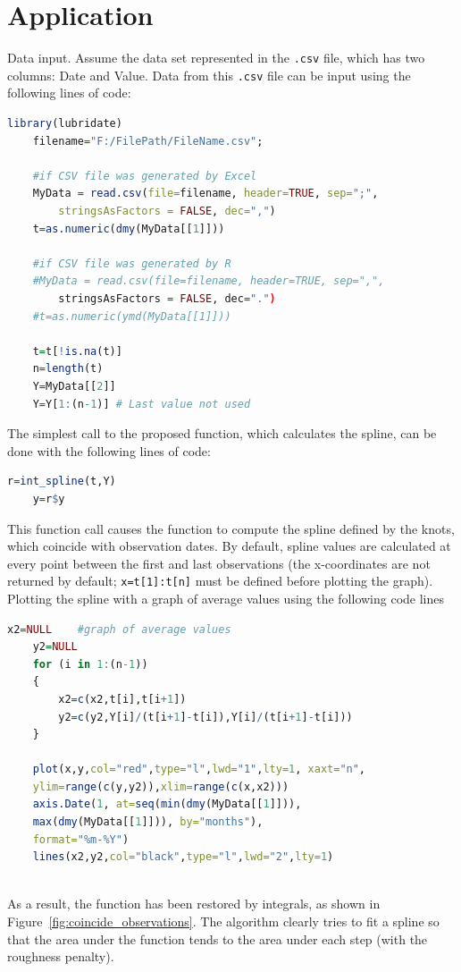 \documentclass[a4paper,10pt]{article}
\begin{document}
\section{Application} \label{sec:application}
Data input. Assume the data set represented in the \lstinline|.csv| file, which has two columns: Date and Value. Data from this \lstinline|.csv| file can be input using the following lines of code:
%
\begin{lstlisting}[language=R]
	library(lubridate)
	filename="F:/FilePath/FileName.csv";
	
	#if CSV file was generated by Excel
	MyData = read.csv(file=filename, header=TRUE, sep=";",
		stringsAsFactors = FALSE, dec=",")
	t=as.numeric(dmy(MyData[[1]]))
	
	#if CSV file was generated by R
	#MyData = read.csv(file=filename, header=TRUE, sep=",",
		stringsAsFactors = FALSE, dec=".")
	#t=as.numeric(ymd(MyData[[1]]))
	
	t=t[!is.na(t)]
	n=length(t)
	Y=MyData[[2]]
	Y=Y[1:(n-1)] # Last value not used 
\end{lstlisting}
%
The simplest call to the proposed function, which calculates the spline, can be done with the following lines of code:
%
\begin{lstlisting}[language=R]
	r=int_spline(t,Y)	
	y=r$y
\end{lstlisting}
%
This function call causes the function to compute the spline defined by the knots, which coincide with observation dates. By default, spline values are calculated at every point between the first and last observations (the x-coordinates are not returned by default; \lstinline|x=t[1]:t[n]| must be defined before plotting the graph). 
\\
Plotting the spline with a graph of average values using the following code lines
%
\begin{lstlisting}[language=R] 
	x2=NULL    #graph of average values
	y2=NULL
	for (i in 1:(n-1))        
	{
		x2=c(x2,t[i],t[i+1])
		y2=c(y2,Y[i]/(t[i+1]-t[i]),Y[i]/(t[i+1]-t[i]))
	}
	
	plot(x,y,col="red",type="l",lwd="1",lty=1, xaxt="n",
	ylim=range(c(y,y2)),xlim=range(c(x,x2)))
	axis.Date(1, at=seq(min(dmy(MyData[[1]])),
	max(dmy(MyData[[1]])), by="months"),
	format="%m-%Y")
	lines(x2,y2,col="black",type="l",lwd="2",lty=1)
	
\end{lstlisting}
%
As a result, the function has been restored by integrals, as shown in Figure~\ref{fig:coincide_observations}.
The algorithm clearly tries to fit a spline so that the area under the function tends to the area under each step (with the roughness penalty).
\end{document}
